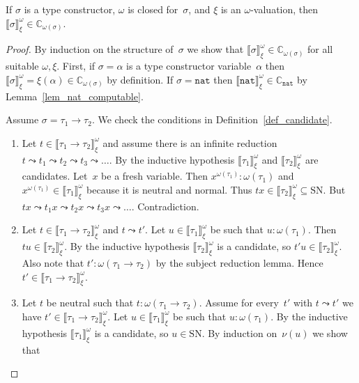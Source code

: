 \documentclass[runningheads,a4paper]{llncs}
\newcommand{\arrtype}{\rightarrow}
\newcommand{\nat}{\mathtt{nat}}
\newcommand{\SN}{\mathrm{SN}}
\newcommand{\Cb}{\mathbb{C}}
\newcommand{\val}[3]{\ensuremath{\llbracket#1\rrbracket_{#2}^{#3}}}
\begin{document}
\begin{lemma}\label{lem_val_computable}
  If $\sigma$ is a type constructor, $\omega$ is closed for~$\sigma$,
  and $\xi$ is an $\omega$-valuation, then $\val{\sigma}{\xi}{\omega}
  \in \Cb_{\omega(\sigma)}$.
\end{lemma}

\begin{proof}
  By induction on the structure of~$\sigma$ we show that
  $\val{\sigma}{\xi}{\omega} \in \Cb_{\omega(\sigma)}$ for all
  suitable $\omega,\xi$. First, if $\sigma = \alpha$ is a type
  constructor variable~$\alpha$ then $\val{\sigma}{\xi}{\omega} =
  \xi(\alpha) \in \Cb_{\omega(\sigma)}$ by definition. If $\sigma =
  \nat$ then $\val{\nat}{\xi}{\omega} \in \Cb_{\nat}$ by
  Lemma~\ref{lem_nat_computable}.

  Assume $\sigma = \tau_1 \arrtype \tau_2$. We check the conditions in
  Definition~\ref{def_candidate}.
  \begin{enumerate}
  \item Let $t \in \val{\tau_1\arrtype\tau_2}{\xi}{\omega}$ and assume
    there is an infinite reduction $t \leadsto t_1 \leadsto t_2
    \leadsto t_3 \leadsto \ldots$. By the inductive hypothesis
    $\val{\tau_1}{\xi}{\omega}$ and $\val{\tau_2}{\xi}{\omega}$ are
    candidates. Let~$x$ be a fresh variable. Then $x^{\omega(\tau_1)}
    : \omega(\tau_1)$ and $x^{\omega(\tau_1)} \in
    \val{\tau_1}{\xi}{\omega}$ because it is neutral and normal. Thus
    $t x \in \val{\tau_2}{\xi}{\omega} \subseteq \SN$. But $t x
    \leadsto t_1 x \leadsto t_2 x \leadsto t_3 x \leadsto
    \ldots$. Contradiction.
  \item Let $t \in \val{\tau_1\arrtype\tau_2}{\xi}{\omega}$ and $t
    \leadsto t'$. Let $u \in \val{\tau_1}{\xi}{\omega}$ be such that
    $u : \omega(\tau_1)$. Then $t u \in \val{\tau_2}{\xi}{\omega}$. By
    the inductive hypothesis $\val{\tau_2}{\xi}{\omega}$ is a
    candidate, so $t' u \in \val{\tau_2}{\xi}{\omega}$. Also note that
    $t' : \omega(\tau_1 \arrtype \tau_2)$ by the subject reduction
    lemma. Hence $t' \in \val{\tau_1\arrtype\tau_2}{\xi}{\omega}$.
  \item Let $t$ be neutral such that $t : \omega(\tau_1 \arrtype
    \tau_2)$. Assume for every~$t'$ with $t \leadsto t'$ we have $t'
    \in \val{\tau_1\arrtype\tau_2}{\xi}{\omega}$. Let $u \in
    \val{\tau_1}{\xi}{\omega}$ be such that $u : \omega(\tau_1)$. By
    the inductive hypothesis $\val{\tau_1}{\xi}{\omega}$ is a
    candidate, so $u \in \SN$. By induction on~$\nu(u)$ we show that

\end{enumerate}
\end{proof}
\end{document}
